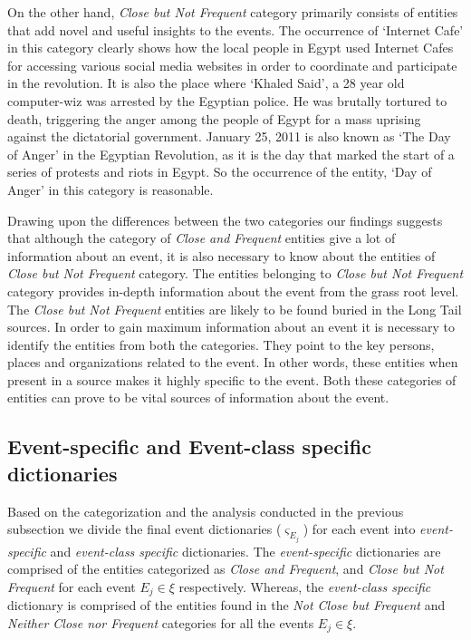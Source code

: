 
On the other hand, \textit{Close but Not Frequent} category primarily consists of entities that add novel and useful insights to the events. The occurrence of `Internet Cafe' in this category clearly shows how the local people in Egypt used Internet Cafes for accessing various social media websites in order to coordinate and participate in the revolution. It is also the place where `Khaled Said', a 28 year old computer-wiz was arrested by the Egyptian police. He was brutally tortured to death, triggering the anger among the people of Egypt for a mass uprising against the dictatorial government.  January 25, 2011 is also known as `The Day of Anger' in the Egyptian Revolution, as it is the day that marked the start of a series of protests and riots in Egypt. So the occurrence of the entity, `Day of Anger' in this category is reasonable. 


Drawing upon the differences between the two categories our findings suggests that although the category of \textit{Close and Frequent} entities give a lot of information about an event, it is also necessary to know about the entities of \textit{Close but Not Frequent} category. The entities belonging to \textit{Close but Not Frequent} category provides in-depth information about the event from the grass root level. The \textit{Close but Not Frequent} entities are likely to be found buried in the Long Tail sources. In order to gain maximum information about an event it is necessary to identify the entities from both the categories. They point to the key persons, places and organizations related to the event. In other words, these entities when present in a source makes it highly specific to the event. Both these categories of entities can prove to be vital sources of information about the event. 



\subsection{\textbf{Event-specific and Event-class specific dictionaries}}
Based on the categorization and the analysis conducted in the previous subsection we divide the final event dictionaries ($\varsigma_{E_{j}}$) for each event into \textit{event-specific} and \textit{event-class specific} dictionaries. The \textit{event-specific} dictionaries are comprised of the entities categorized as \textit{Close and Frequent}, and \textit{Close but Not Frequent} for each event $E_{j} \in \xi$ respectively. Whereas, the \textit{event-class specific} dictionary is comprised of the entities found in the \textit{Not Close but Frequent} and \textit{Neither Close nor Frequent} categories for all the events $E_{j} \in \xi$.

